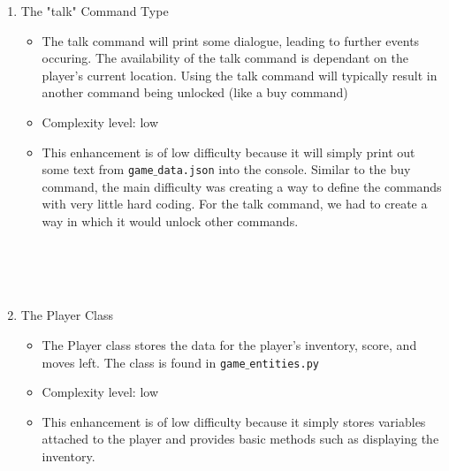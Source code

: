 \documentclass[11pt]{article}
\begin{document}
\begin{enumerate}
\begin{itemize}
    \end{itemize}
    \item The "talk" Command Type
    \begin{itemize}
        \item The talk command will print some dialogue, leading to further events occuring. The availability of the talk command is dependant on the player's current location. Using the talk command will typically result in another command being unlocked (like a buy command)
        \item Complexity level: low
        \item This enhancement is of low difficulty because it will simply print out some text from \texttt{game$\_$data.json} into the console. Similar to the buy command, the main difficulty was creating a way to define the commands with very little hard coding. For the talk command, we had to create a way in which it would unlock other commands.
    \end{itemize}
\\\\\\
    \item The Player Class
    \begin{itemize}
        \item The Player class stores the data for the player's inventory, score, and moves left. The class is found in \texttt{game$\_$entities.py}
        \item Complexity level: low
        \item This enhancement is of low difficulty because it simply stores variables attached to the player and provides basic methods such as displaying the inventory. 
    \end{itemize}

\end{enumerate}
\end{document}

